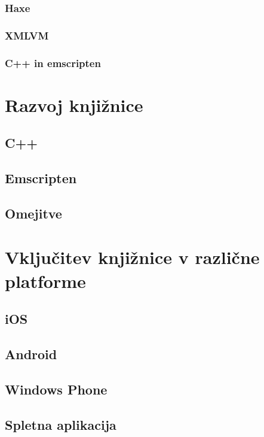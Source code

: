 \subsection{Haxe}

\subsection{XMLVM}

\subsection{C++ in emscripten}

\chapter{Razvoj knjižnice}
\label{chap:development}

\section{C++}

\section{Emscripten}

\section{Omejitve}

\chapter{Vključitev knjižnice v različne platforme}
\label{chap:cross-platform}

\section{iOS}

\section{Android}

\section{Windows Phone}

\section{Spletna aplikacija}
